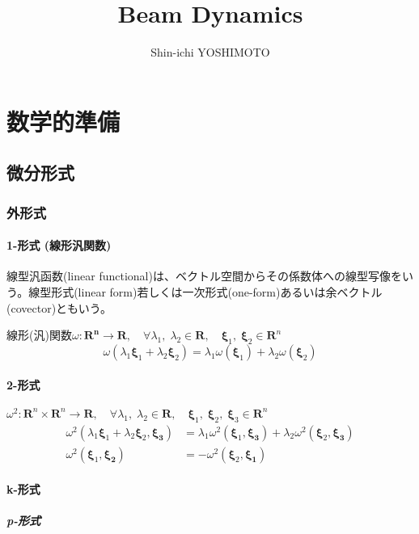 \documentclass[book]{jlreq}
\begin{document}
\title{Beam Dynamics}
\author{Shin-ichi YOSHIMOTO}
\maketitle
\tableofcontents
\clearpage

\part{数学的準備}
\chapter{微分形式}
\section{外形式}
\subsection{1-形式 (線形汎関数)}
線型汎函数(linear functional)は、ベクトル空間からその係数体への線型写像をいう\cite{Shiga}。線型形式(linear form)若しくは一次形式(one-form)\cite{Fukaya}あるいは余ベクトル(covector)ともいう\cite{Arnold}。

線形(汎)関数$\omega:\mathbf{R^n} \rightarrow\mathbf{R},\quad
\forall\lambda_1,\;\lambda_2 \in \mathbf{R},\quad\bm{\xi}_1,\;\bm{\xi}_2 \in \mathbf{R}^n$
%
\begin{equation}
    \omega(\lambda_1\bm{\xi}_1+\lambda_2\bm{\xi}_2)= \lambda_1\omega(\bm{\xi}_1)+\lambda_2\omega(\bm{\xi}_2)
\end{equation}
%
\subsection{2-形式}
$\omega^2:\mathbf{R}^n\times\mathbf{R}^n \rightarrow\mathbf{R},\quad
\forall\lambda_1,\;\lambda_2 \in \mathbf{R},\quad\bm{\xi}_1,\;\bm{\xi}_2,\;\bm{\xi}_3 \in \mathbf{R}^n$
%
\begin{align}
    \omega^2(\lambda_1\bm{\xi}_1+\lambda_2\bm{\xi}_2,\bm{\xi_3})
    &= \lambda_1\omega^2(\bm{\xi}_1,\bm{\xi_3})+\lambda_2\omega^2(\bm{\xi}_2,\bm{\xi_3})\\
    \omega^2(\bm{\xi}_1,\bm{\xi_2})&=-\omega^2(\bm{\xi}_2,\bm{\xi_1})
\end{align}

\subsection{k-形式}
\subsubsection{p-形式}
\end{document}
